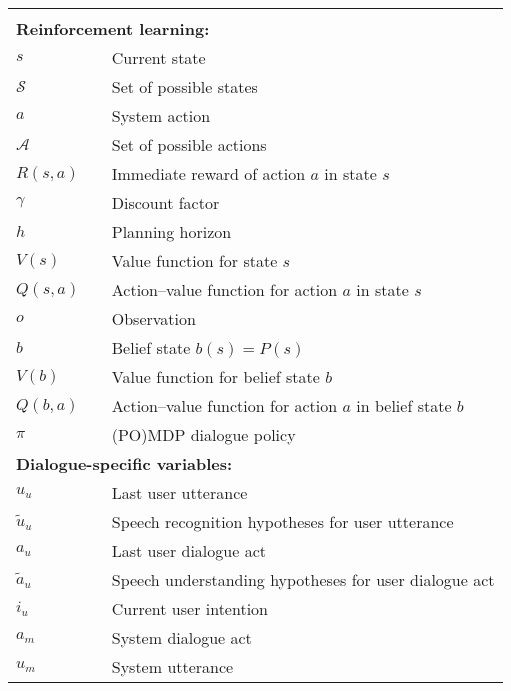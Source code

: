 \begin{longtable}{lp{5mm}p{95mm}}
&&  \vspace{0mm} \\
\multicolumn{3}{l}{\textbf{Reinforcement learning:}} \vspace{2mm} \\
$s$ && Current state \\
$\mathcal{S}$ && Set of possible states \\
$a$ && System action \\ 
$\mathcal{A}$ && Set of possible actions \\
$R(s,a)$ && Immediate reward of action $a$ in state $s$ \\
$\gamma$ && Discount factor \\
$h$ && Planning horizon \\
$V(s)$ && Value function for state $s$ \\
$Q(s,a)$ && Action--value function for action $a$ in state $s$  \\
$o$ && Observation \\
$b$ && Belief state $b(s) = P(s)$ \\
$V(b)$ && Value function for belief state $b$  \\
$Q(b,a)$ && Action--value function for action $a$ in belief state $b$ \\
$\pi$ && (PO)MDP dialogue policy \\

\multicolumn{3}{l}{\textbf{Dialogue-specific variables:}} \vspace{2mm} \\

$u_u$ && Last user utterance \\
$\tilde{u}_u$ && Speech recognition hypotheses for user utterance \\
$a_u$ && Last user dialogue act \\
$\tilde{a}_u$ && Speech understanding hypotheses for user dialogue act \\
$i_u$ && Current user intention \\
$a_m$ && System dialogue act \\
$u_m$ && System utterance \\


\end{longtable}

